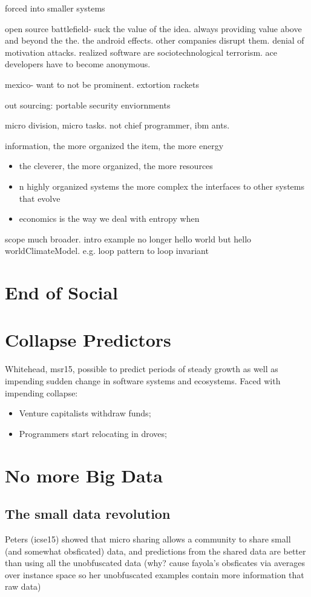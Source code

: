 \documentclass[journal]{IEEEtran}
\newcommand{\bi}{\begin{itemize}}
\newcommand{\ei}{\end{itemize}}
\begin{document}
\begin{itemize}
{forced into smaller systems

open source battlefield- suck the value of the idea. always providing value above and beyond
the the. the android effects. other companies disrupt them. denial of motivation attacks. realized software are sociotechnological terrorism. ace developers have to become anonymous.

mexico- want to not be prominent. extortion rackets 

out sourcing: portable security enviornments

micro division, micro tasks. not chief programmer, ibm ants.

information, the more organized the item, the more energy 
\bi
\item the cleverer, the more organized, the more resources
\item n highly organized systems the more complex the interfaces to other systems that evolve
\item economics is the way we deal with entropy when 
\ei

scope much broader. intro example no longer hello world but hello worldClimateModel. e.g. loop pattern to loop invariant

\section{End of Social}


\section{Collapse Predictors}

Whitehead, msr15, possible to predict periods of steady growth
as well as impending sudden change in software systems and
ecosystems. Faced with impending collapse:
\bi
\item Venture capitalists withdraw funds;
\item Programmers start relocating in droves;
\ei
 

\section{No more Big Data}

\subsection{The small data revolution}

Peters (icse15) showed that micro sharing allows a community to share small (and somewhat obsficated) data, and predictions from the shared data are better than using all the unobfuscated data (why? cause fayola's obsficates via   averages over instance space so her 
unobfuscated examples contain more information that raw data)

}
\end{itemize}
\end{document}
